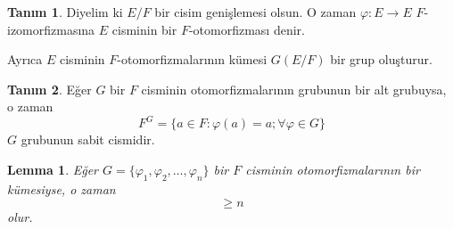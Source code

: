\documentclass[draft]{article}
\newtheorem{lem}[thm]{Lemma}
\theoremstyle{definition}
\newtheorem{defn}{Tanım}[section]
\theoremstyle{remark}
\begin{document}
    	    \begin{defn}
    	        Diyelim ki $E/F$ bir cisim genişlemesi olsun. O zaman $\varphi: E \to E$ $F$-izomorfizmasına $E$ cisminin bir $F$-otomorfizması denir.\par
    	        Ayrıca $E$ cisminin $F$-otomorfizmalarının kümesi $G(E/F)$ bir grup oluşturur.
    	    \end{defn}
    		
    		\begin{defn}
    		    Eğer $G$ bir $F$ cisminin otomorfizmalarının grubunun bir alt grubuysa, o zaman
    		    \begin{equation*}
    				F^G = \{a \in F : \varphi(a) = a; \forall \varphi \in G\}
    			\end{equation*}
    			$G$ grubunun sabit cismidir.
    		\end{defn}
    		
    		\begin{lem}
    		    Eğer $G = \{\varphi_1, \varphi_2, \dots, \varphi_n\}$ bir $F$ cisminin otomorfizmalarının bir kümesiyse, o zaman
    		    \begin{equation*}
    				[F : F^G] \geq n
    			\end{equation*}
    			olur.
    		\end{lem}
    		
\end{document}
